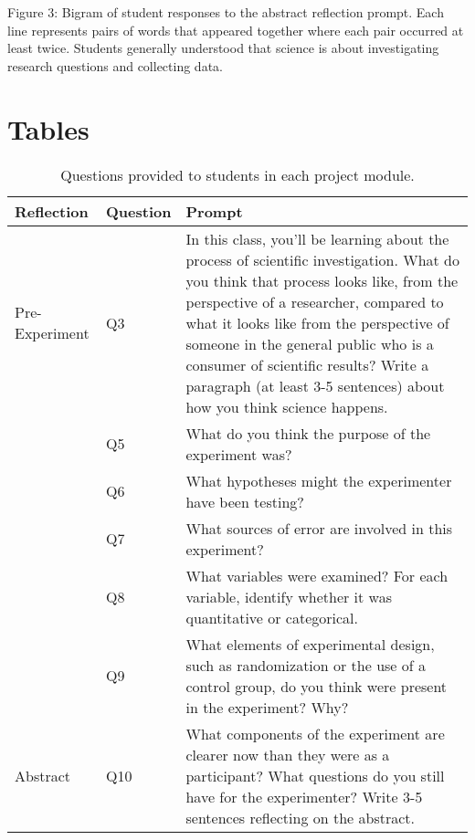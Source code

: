\documentclass[
  12pt,
]{article}
\begin{document}
Figure 3: Bigram of student responses to the abstract reflection prompt.
Each line represents pairs of words that appeared together where each
pair occurred at least twice. Students generally understood that science
is about investigating research questions and collecting data.

\newpage

\section{Tables}\label{tables}

\begin{table}

\caption{\label{tab:unnamed-chunk-4}Questions provided to students in each project module.}
\centering
\fontsize{10}{12}\selectfont
\begin{tabu} to 
\toprule
Reflection & Question & Prompt\\
\midrule
Pre-Experiment & Q3 & In this class, you'll be learning about the process of scientific investigation. What do you think that process looks like, from the perspective of a researcher, compared to what it looks like from the perspective of someone in the general public who is a consumer of scientific results? Write a paragraph (at least 3-5 sentences) about how you think science happens.\\
 & Q5 & What do you think the purpose of the experiment was?\\
 & Q6 & What hypotheses might the experimenter have been testing?\\
 & Q7 & What sources of error are involved in this experiment?\\
 & Q8 & What variables were examined? For each variable, identify whether it was quantitative or categorical.\\
 & Q9 & What elements of experimental design, such as randomization or the use of a control group, do you think were present in the experiment? Why?\\
Abstract & Q10 & What components of the experiment are clearer now than they were as a participant? What questions do you still have for the experimenter? Write 3-5 sentences reflecting on the abstract.\\

\end{tabu}
\end{table}
\end{document}
